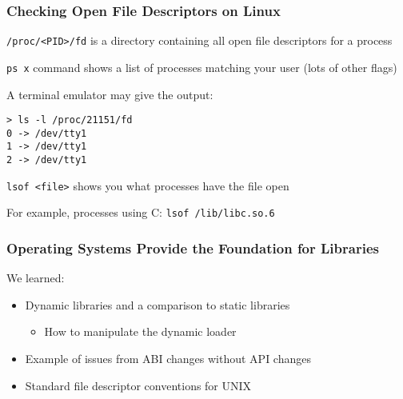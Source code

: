   \begin{frame}[fragile]
    \frametitle{Checking Open File Descriptors on Linux}

    \texttt{/proc/<PID>/fd} \hspace{0.5em} is a directory containing all open
    file descriptors for a process

    \texttt{ps x} \hspace{0.5em} command shows a list of processes matching your
    user (lots of other flags)

    \vspace{1em}

    A terminal emulator may give the output:
    \begin{lstlisting}[basicstyle=\small\ttfamily]
> ls -l /proc/21151/fd
0 -> /dev/tty1
1 -> /dev/tty1
2 -> /dev/tty1
    \end{lstlisting}

    \vspace{2em}

    \texttt{lsof <file>} \hspace{0.5em} shows you what processes have the file
    open

    \hspace{2em} For example, processes using C: \hspace{0.5em}
    \texttt{lsof /lib/libc.so.6}
  \end{frame}

  \begin{frame}
    \frametitle{Operating Systems Provide the Foundation for Libraries}

    We learned:
    \begin{itemize}
      \item Dynamic libraries and a comparison to static libraries
      \begin{itemize}
        \item How to manipulate the dynamic loader
      \end{itemize}
      \item Example of issues from ABI changes without API changes
      \item Standard file descriptor conventions for UNIX
    \end{itemize}
  \end{frame}


